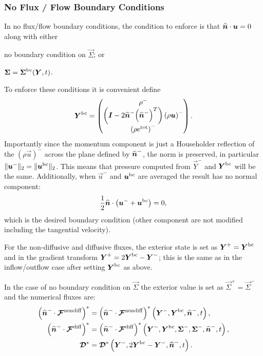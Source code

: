 \documentclass{report}
\begin{document}
\subsubsection{No Flux / Flow Boundary Conditions}
In no flux/flow boundary conditions, the condition to enforce is that $\nhat
\cdot \vec{u} = 0$ along with either
\begin{enumerate*}[label = (\roman*)]
  \item no boundary condition on $\vec{\Sigma}$; or
  \item $\vec{\Sigma} = \vec{\Sigma}^{\rm bc}(\vec{Y}, t)$.
\end{enumerate*}
To enforce these conditions it is convenient define
\begin{align}
  \vec{Y}^{\rm bc}
  =
  \begin{pmatrix}
    \rho^{-}\\
    \left(\vec{I} - 2 \nhat^{-} {\left(\nhat^{-}\right)}^{T}\right)
    {\left(\rho \vec{u}\right)}^{-}\\
    {\left(\rho e^{\rm tot}\right)}^{-}
  \end{pmatrix}.
\end{align}
Importantly since the momentum component is just a Householder reflection of the
${\left(\rho \vec{u}\right)}^{-}$ across the plane defined by $\nhat^{-}$, the
norm is preserved, in particular $\|\vec{u}^{-}\|_{2} = \|\vec{u}^{\rm
bc}\|_{2}$. This means that pressure computed from $\vec{Y}^{-}$ and
$\vec{Y}^{\rm bc}$ will be the same. Additionally, when $\vec{u}^{-}$ and
$\vec{u}^{\rm bc}$ are averaged the result has no normal component:
\begin{align}
  \frac{1}{2}\nhat\cdot\left(\vec{u}^{-} + \vec{u}^{\rm bc}\right) = 0,
\end{align}
which is the desired boundary condition (other component are not modified
including the tangential velocity).

For the non-diffusive and diffusive fluxes, the exterior state is set as
$\vec{Y}^{+} = \vec{Y}^{\rm bc}$ and in the gradient transform
$\vec{Y}^{+} = 2\vec{Y}^{\rm bc} - \vec{Y}^{-}$; this is the same as in the
inflow/outflow case after setting $\vec{Y}^{\rm bc}$ as above.

In the case of no boundary condition on $\vec{\Sigma}$ the exterior value is set
as $\vec{\Sigma}^{+} = \vec{\Sigma}^{-}$ and the numerical fluxes are:
\begin{align}
  {\left( \nhat^{-} \cdot \Fnondiff\right)}^{*} &=
  {\left( \nhat^{-} \cdot \Fnondiff\right)}^{*}
  \left(\vec{Y}^{-}, \vec{Y}^{\rm bc}, \nhat^{-}, t\right),\\
  {\left( \nhat^{-} \cdot \Fdiff\right)}^{*} &=
  {\left( \nhat^{-} \cdot \Fdiff\right)}^{*}
  \left(\vec{Y}^{-}, \vec{Y}^{\rm bc}, \vec{\Sigma}^{-}, \vec{\Sigma}^{-},
  \nhat^{-}, t\right),\\
  \diffusive^{*} &=
  \diffusive^{*}
  \left(\vec{Y}^{-}, 2\vec{Y}^{\rm bc}-\vec{Y}^{-}, \nhat^{-}, t\right).
\end{align}
\end{document}
